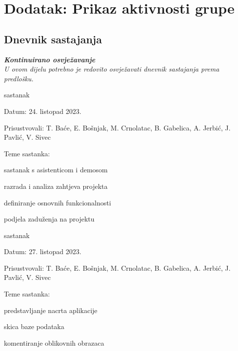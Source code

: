 \chapter*{Dodatak: Prikaz aktivnosti grupe}
		
		\section*{Dnevnik sastajanja}
		
		\textbf{\textit{Kontinuirano osvježavanje}}\\
		
		 \textit{U ovom dijelu potrebno je redovito osvježavati dnevnik sastajanja prema predlošku.}
		
		\begin{packed_enum}
			
			\item  sastanak
			\item[] \begin{packed_item}
				\item Datum: 24. listopad 2023.
				\item Prisustvovali: T. Baće, E. Bošnjak, M. Crnolatac, B. Gabelica, A. Jerbić, J. Pavlić, V. Sivec
				\item Teme sastanka:
				\begin{packed_item}
					\item sastanak s asistenticom i demosom
					\item  razrada i analiza zahtjeva projekta
					\item  definiranje osnovnih funkcionalnosti
					\item  podjela zaduženja na projektu
				\end{packed_item}
			\end{packed_item}
			
			\item  sastanak
			\item[] \begin{packed_item}
				\item Datum: 27. listopad 2023.
				\item Prisustvovali: T. Baće, E. Bošnjak, M. Crnolatac, B. Gabelica, A. Jerbić, J. Pavlić, V. Sivec
				\item Teme sastanka:
				\begin{packed_item}
					\item  predstavljanje nacrta aplikacije
					\item  skica baze podataka
					\item  komentiranje oblikovnih obrazaca
				\end{packed_item}
			\end{packed_item}
			

\end{packed_enum}
